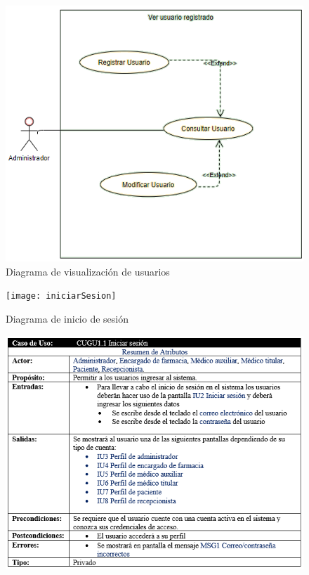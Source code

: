 \documentclass[12pt,letterpaper]{article}
\begin{document}
{\begin{figure}[H]
        \end{figure}
        \begin{figure}[H]
            \centering
            \includegraphics [scale=0.3]{verUsuario}
            \caption{Diagrama de visualización de usuarios}
        \end{figure}
        \begin{figure}[H]
            \centering
            \texttt{[image: iniciarSesion]}
            \caption{Diagrama de inicio de sesión}
        \end{figure}
        \begin{figure}[H]
            \centering
            \includegraphics [scale=0.9]{especificacionInicio}

\end{figure}}
\end{document}
